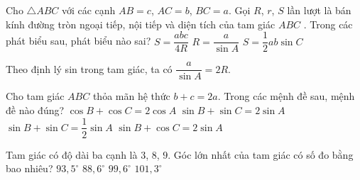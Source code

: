 \begin{ex}
	Cho $\triangle ABC$ với các cạnh $AB=c$, $AC=b$, $BC=a$. Gọi $R$, $r$, $S$ lần lượt là bán kính đường tròn ngoại tiếp, nội tiếp và diện tích của tam giác $ABC$ . Trong các phát biểu sau, phát biểu nào sai?
	\choice
	{$S=\dfrac{abc}{4R}$ }
	{\True $R=\dfrac{a}{\sin A}$ }
	{$S=\dfrac{1}{2}ab\sin C$ }
	
	\loigiai
	{
		Theo định lý sin trong tam giác, ta có $\dfrac{a}{\sin A}=2R$.
	}
\end{ex}
\begin{ex}
	Cho tam giác $ABC$ thỏa mãn hệ thức $b+c=2a$. Trong các mệnh đề sau, mệnh đề nào đúng?
	\choice
	{$\cos B+\cos C=2\cos A$}
	{\True $\sin B+\sin C=2\sin A$}
	{$\sin B+\sin C=\dfrac{1}{2}\sin A$}
	{$\sin B+\cos C=2\sin A$}
\end{ex}
\begin{ex}
	Tam giác có độ dài ba cạnh là $3$, $8$, $9$. Góc lớn nhất của tam giác có số đo bằng bao nhiêu?
	\choice
	{$93{,}5^\circ$}
	{$88{,}6^\circ$}
	{\True $99{,}6^\circ$}
	{$101{,}3^\circ$}
\end{ex}

